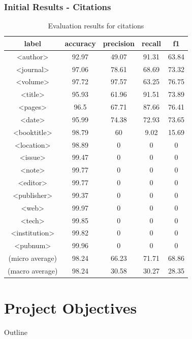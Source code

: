 \documentclass{beamer}
\begin{document}
\begin{frame}
\frametitle{Initial Results - Citations}

\begin{center}
\begingroup
\fontsize{8pt}{10pt}\selectfont

\begin{table}[h]
\begin{tabular}{ccccc}
\hline
label & accuracy & precision & recall & f1 \\
\hline
<author>	&92.97&49.07&91.31&63.84 \\
<journal>	&	97.06&		78.61	&	68.69	&	73.32\\
<volume>&		97.72&		97.57	&	63.25	&	76.75\\
<title>&		95.93	&	61.96	&	91.51	&	73.89\\
<pages>&		96.5		&67.71	&	87.66	&	76.41\\
<date>&		95.99	&	74.38	&	72.93	&	73.65\\
<booktitle>&		98.79	&	60	&	9.02	&	15.69\\
<location>&		98.89&		0	&	0	&	0\\
<issue>&		99.47	&	0	&	0	&	0\\
<note>&		99.77	&	0	&	0	&	0\\
<editor>&		99.77&		0	&	0	&	0\\
<publisher>&		99.37&		0	&	0	&	0\\
<web>&		99.97	&	0	&	0	&	0\\
<tech>&		99.85	&	0	&	0	&	0\\
<institution>&	99.82	&	0	&	0	&	0\\
<pubnum>&		99.96	&	0	&	0	&	0\\
\hline
(micro average) & 98.24	&	66.23&		71.71	&	68.86	\\
(macro average) & 98.24&		30.58&		30.27&		28.35	\\
\hline
\end{tabular}
\caption[Table caption text]{Evaluation results for citations}
\end{table}

\endgroup
\end{center}

\end{frame}


\section{Project Objectives}
\begin{frame}[noframenumbering]{Outline}
\tableofcontents[currentsection]
\end{frame}
\end{document}
